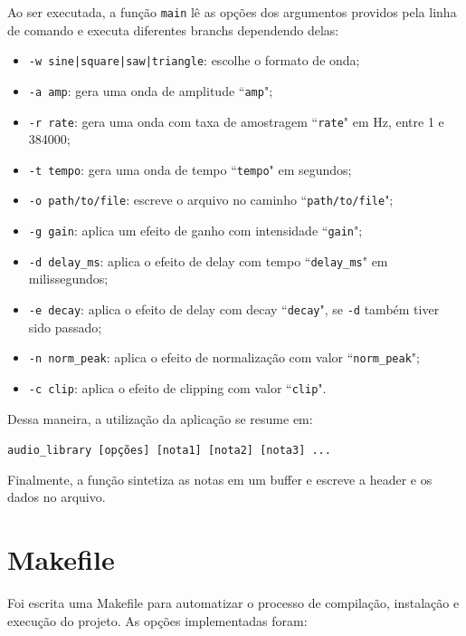 \documentclass{article}
\begin{document}
Ao ser executada, a função \texttt{main} lê as opções dos argumentos providos pela linha de comando e executa diferentes branchs dependendo delas:
\begin{itemize}
    \item \texttt{-w sine|square|saw|triangle}: escolhe o formato de onda;
    \item \texttt{-a amp}: gera uma onda de amplitude ``\texttt{amp}";
    \item \texttt{-r rate}: gera uma onda com taxa de amostragem ``\texttt{rate}" em Hz, entre 1 e 384000;
    \item \texttt{-t tempo}: gera uma onda de tempo ``\texttt{tempo}" em segundos;
    \item \texttt{-o path/to/file}: escreve o arquivo no caminho ``\texttt{path/to/file}";
    \item \texttt{-g gain}: aplica um efeito de ganho com intensidade ``\texttt{gain}";
    \item \texttt{-d delay\_ms}: aplica o efeito de delay com tempo ``\texttt{delay\_ms}" em milissegundos;
    \item \texttt{-e decay}: aplica o efeito de delay com decay ``\texttt{decay}", se \texttt{-d} também tiver sido passado;
    \item \texttt{-n norm\_peak}: aplica o efeito de normalização com valor ``\texttt{norm\_peak}";
    \item \texttt{-c clip}: aplica o efeito de clipping com valor ``\texttt{clip}".
\end{itemize}

Dessa maneira, a utilização da aplicação se resume em:

\centerline{\texttt{audio\_library [opções] [nota1] [nota2] [nota3] ...}}


Finalmente, a função sintetiza as notas em um buffer e escreve a header e os dados no arquivo.

\section{Makefile}
Foi escrita uma Makefile para automatizar o processo de compilação, instalação e execução do projeto. As opções implementadas foram:
\end{document}
